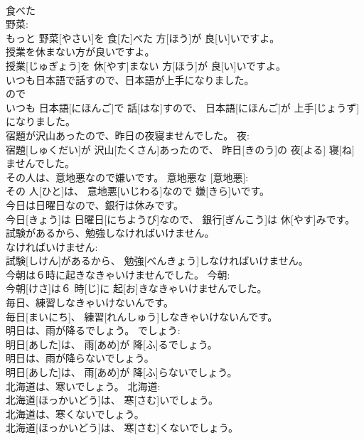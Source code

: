 \documentclass[8pt]{extreport}
\begin{document}
\begin{CJK}{UTF8}{min}
\\	食べた 
\\	野菜: 
\\	もっと 野菜[やさい]を 食[た]べた 方[ほう]が 良[い]いですよ。	
\\	授業を休まない方が良いですよ。	
\\	授業[じゅぎょう]を 休[やす]まない 方[ほう]が 良[い]いですよ。	
\\	いつも日本語で話すので、日本語が上手になりました。	
\\	ので 
\\	いつも 日本語[にほんご]で 話[はな]すので、 日本語[にほんご]が 上手[じょうず]になりました。	
\\	宿題が沢山あったので、昨日の夜寝ませんでした。	夜: 
\\	宿題[しゅくだい]が 沢山[たくさん]あったので、 昨日[きのう]の 夜[よる] 寝[ね]ませんでした。	
\\	その人は、意地悪なので嫌いです。	意地悪な [意地悪]: 
\\	その 人[ひと]は、 意地悪[いじわる]なので 嫌[きら]いです。	
\\	今日は日曜日なので、銀行は休みです。	
\\	今日[きょう]は 日曜日[にちようび]なので、 銀行[ぎんこう]は 休[やす]みです。	
\\	試験があるから、勉強しなければいけません。	
\\	なければいけません: 
\\	試験[しけん]があるから、 勉強[べんきょう]しなければいけません。	
\\	今朝は６時に起きなきゃいけませんでした。	今朝: 
\\	今朝[けさ]は６ 時[じ]に 起[お]きなきゃいけませんでした。	
\\	毎日、練習しなきゃいけないんです。	
\\	毎日[まいにち]、 練習[れんしゅう]しなきゃいけないんです。	
\\	明日は、雨が降るでしょう。	でしょう: 
\\	明日[あした]は、 雨[あめ]が 降[ふ]るでしょう。	
\\	明日は、雨が降らないでしょう。	
\\	明日[あした]は、 雨[あめ]が 降[ふ]らないでしょう。	
\\	北海道は、寒いでしょう。	北海道: 
\\	北海道[ほっかいどう]は、 寒[さむ]いでしょう。	
\\	北海道は、寒くないでしょう。	
\\	北海道[ほっかいどう]は、 寒[さむ]くないでしょう。	

\end{CJK}
\end{document}
